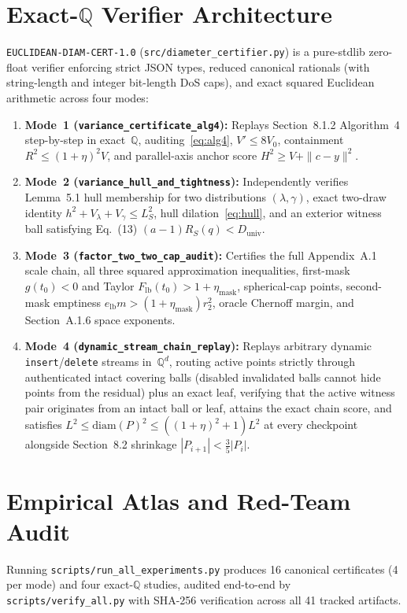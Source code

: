 \documentclass[11pt,twocolumn]{article}
\newcommand{\QQ}{\mathbb{Q}}
\begin{document}
\section{Exact-\texorpdfstring{$\QQ$}{Q} Verifier Architecture}\label{sec:certifier}
\texttt{EUCLIDEAN-DIAM-CERT-1.0} (\texttt{src/diameter\_certifier.py}) is a pure-stdlib zero-float verifier enforcing strict JSON types, reduced canonical rationals (with string-length and integer bit-length DoS caps), and exact squared Euclidean arithmetic across four modes:
\begin{enumerate}[leftmargin=*,nosep]
  \item \textbf{Mode~1 (\texttt{variance\_certificate\_\allowbreak alg4}):} Replays Section~8.1.2 Algorithm~4 step-by-step in exact~$\QQ$, auditing~\eqref{eq:alg4}, $V' \le 8V_0$, containment $R^2 \le (1+\eta)^2 V$, and parallel-axis anchor score $H^2 \ge V + \|c-y\|^2$.
  \item \textbf{Mode~2 (\texttt{variance\_hull\_and\_\allowbreak tightness}):} Independently verifies Lemma~5.1 hull membership for two distributions $(\lambda, \gamma)$, exact two-draw identity $h^2+V_\lambda+V_\gamma \le L_S^2$, hull dilation~\eqref{eq:hull}, and an exterior witness ball satisfying Eq.~(13) $(a-1)R_S(q) < D_{\mathrm{univ}}$.
  \item \textbf{Mode~3 (\texttt{factor\_two\_two\_\allowbreak cap\_audit}):} Certifies the full Appendix~A.1 scale chain, all three squared approximation inequalities, first-mask $g(t_0) < 0$ and Taylor $F_{\mathrm{lb}}(t_0) > 1+\eta_{\mathrm{mask}}$, spherical-cap points, second-mask emptiness $e_{\mathrm{lb}} m > (1+\eta_{\mathrm{mask}})r_2^2$, oracle Chernoff margin, and Section~A.1.6 space exponents.
  \item \textbf{Mode~4 (\texttt{dynamic\_stream\_\allowbreak chain\_replay}):} Replays arbitrary dynamic \texttt{insert}/\texttt{delete} streams in~$\QQ^d$, routing active points strictly through authenticated intact covering balls (disabled invalidated balls cannot hide points from the residual) plus an exact leaf, verifying that the active witness pair originates from an intact ball or leaf, attains the exact chain score, and satisfies $L^2 \le \mathrm{diam}(P)^2 \le ((1+\eta)^2+1)L^2$ at every checkpoint alongside Section~8.2 shrinkage $|P_{i+1}| < \frac{3}{5}|P_i|$.
\end{enumerate}

\section{Empirical Atlas and Red-Team Audit}\label{sec:results}
Running \texttt{scripts/run\_all\_experiments.py} produces 16 canonical certificates (4 per mode) and four exact-$\QQ$ studies, audited end-to-end by \texttt{scripts/verify\_all.py} with SHA-256 verification across all 41 tracked artifacts.
\end{document}

